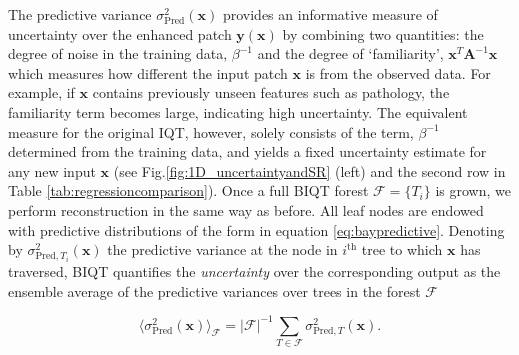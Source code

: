 	
	
	The predictive variance $\sigma_{\text{Pred}}^2(\mathbf{x})$ provides an informative measure of uncertainty over the enhanced patch $\mathbf{y}(\mathbf{x})$ by combining two quantities: the degree of noise in the training data, $\beta^{-1}$ and the degree of `familiarity', $\mathbf{x}^{T}\mathbf{A}^{-1}\mathbf{x}$ which measures how different the input patch $\mathbf{x}$ is from the observed data. For example, if $\mathbf{x}$ contains previously unseen features such as pathology, the familiarity term becomes large, indicating high uncertainty. The equivalent measure for the original IQT, however, solely consists of the term, $\beta^{-1}$ determined from the training data, and yields a fixed uncertainty estimate for any new input $\mathbf{x}$  (see Fig.\ref{fig:1D_uncertaintyandSR} (left) and the second row in Table \ref{tab:regressioncomparison}). Once a full BIQT forest $\mathcal{F} =\{T_{i}\}$ is grown, we perform reconstruction in the same way as before. All leaf nodes are endowed with predictive distributions of the form in equation \eqref{eq:baypredictive}. Denoting by $\sigma_{\text{Pred},T_i}^2(\mathbf{x})$ the predictive variance at the node in $i^{\text{th}}$ tree to which $\mathbf{x}$ has traversed, BIQT quantifies the \textit{uncertainty} over the corresponding output as the ensemble average of the predictive variances over trees in the forest $\mathcal{F}$
	
	\begin{equation}
	\langle\sigma^2_{\text{Pred}}(\mathbf{x})\rangle_{\mathcal{F}} = |\mathcal{F}|^{-1}\sum_{T\in \mathcal{F}}\sigma_{\text{Pred},T}^2(\mathbf{x}).
	\end{equation} 

